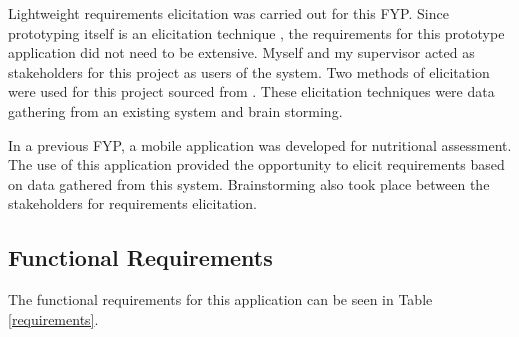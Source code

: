 Lightweight requirements elicitation was carried out for this FYP.
Since prototyping itself is an elicitation technique \parencite{reqs}, the requirements for this prototype application did not need to be extensive.
Myself and my supervisor acted as stakeholders for this project as users of the system.
Two methods of elicitation were used for this project sourced from \parencite{reqs}.
These elicitation techniques were data gathering from an existing system and brain storming.

In a previous FYP, a mobile application was developed for nutritional assessment.
The use of this application provided the opportunity to elicit requirements based on data gathered from this system. Brainstorming also took place between the stakeholders for requirements elicitation.

\subsection*{Functional Requirements}
The functional requirements for this application can be seen in Table \ref{requirements}.

